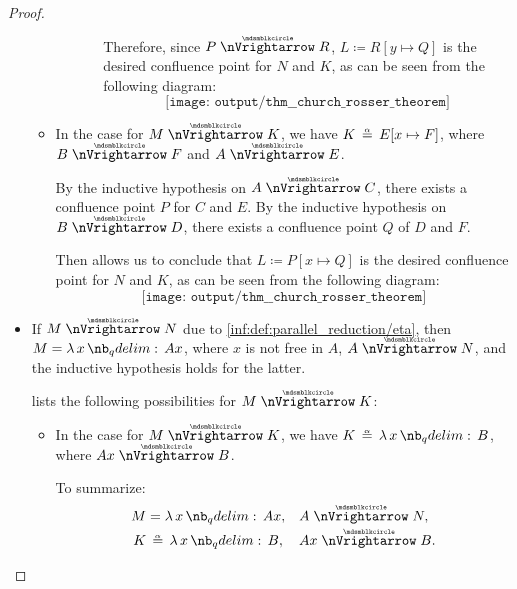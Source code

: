 \begin{proof}
\begin{itemize}
\begin{itemize}
\begin{itemize}
\begin{itemize}
          Therefore, since \( P \ppred R \), \( L \coloneqq R[y \mapsto Q] \) is the desired confluence point for \( N \) and \( K \), as can be seen from the following diagram:
          \begin{equation*}
            \texttt{[image: output/thm\_\_church\_rosser\_theorem]}
          \end{equation*}
        \end{itemize}
      \end{itemize}

      \item In the case  for \( M \ppred K \), we have \( K \aequiv E[x \mapsto F] \), where \( B \ppred F \) and \( A \ppred E \).

      By the inductive hypothesis on \( A \ppred C \), there exists a confluence point \( P \) for \( C \) and \( E \). By the inductive hypothesis on \( B \ppred D \), there exists a confluence point \( Q \) of \( D \) and \( F \).

      Then  allows us to conclude that \( L \coloneqq P[x \mapsto Q] \) is the desired confluence point for \( N \) and \( K \), as can be seen from the following diagram:
      \begin{equation*}
        \texttt{[image: output/thm\_\_church\_rosser\_theorem]}
      \end{equation*}
    \end{itemize}

    \item If \( M \ppred N \) due to \ref{inf:def:parallel_reduction/eta}, then \( M = \qabs x A x \), where \( x \) is not free in \( A \), \( A \ppred N \), and the inductive hypothesis holds for the latter.

     lists the following possibilities for \( M \ppred K \):
    \begin{itemize}
      \item In the case  for \( M \ppred K \), we have \( K \aequiv \qabs x B \), where \( Ax \ppred B \).

      To summarize:
      \begin{align*}
        M &= \qabs x A x,        &&A \ppred N, \\
        K &\aequiv \qabs x B,    &&Ax \ppred B.
      \end{align*}


\end{itemize}
\end{itemize}
\end{proof}
